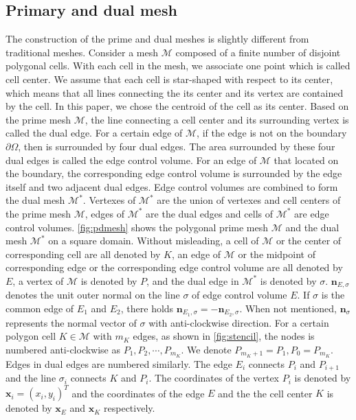 \documentclass[times,review,preprint]{elsarticle}
\newcommand{\bx}{\bm{x}}
\newcommand{\bn}{\bm{n}}
\begin{document}
\subsection{Primary and dual mesh}\label{sec:mesh}

The construction of the prime and dual meshes is slightly different from traditional meshes.
Consider a mesh $\mathcal{M}$ composed of a finite number of disjoint polygonal cells. With each cell in the mesh, we associate one point which is called cell center. We assume that each cell is star-shaped with respect to its center, which means that all lines connecting the its center and its vertex are contained by the cell. In this paper, we chose the centroid of the cell as its center.
Based on the prime mesh $\mathcal{M}$, the line connecting a cell center and its surrounding vertex is called the dual edge. For a certain edge of $\mathcal{M}$, if the edge is not on the boundary $\partial \Omega$, then is surrounded by four dual edges. The area surrounded by these four dual edges is called the edge control volume. For an edge of $\mathcal{M}$ that located on the boundary, the corresponding edge control volume is surrounded by the edge itself and two adjacent dual edges. Edge control volumes are combined to form the dual mesh $\mathcal{M}^*$.
Vertexes of $\mathcal{M}^*$ are the union of vertexes and cell centers of the prime mesh $\mathcal{M}$, edges of $\mathcal{M}^*$ are the dual edges and cells of $\mathcal{M}^*$ are edge control volumes. \cref{fig:pdmesh} shows the polygonal prime mesh $\mathcal{M}$ and the dual mesh $\mathcal{M}^*$ on a square domain.
Without misleading, a cell of $\mathcal{M}$ or the center of corresponding cell are all denoted by $K$, an edge of $\mathcal{M}$ or the midpoint of corresponding edge or the corresponding edge control volume are all denoted by $E$, a vertex of $\mathcal{M}$ is denoted by $P$, and the dual edge in $\mathcal{M}^*$ is denoted by $\sigma$.
$\bn_{E, \sigma}$ denotes the unit outer normal on the line $\sigma$ of edge control volume $E$. If $\sigma$ is the common edge of $E_1$ and $E_2$, there holds $\bn_{E_1, \sigma} = -\bn_{E_2, \sigma}$. When not mentioned, $\bn_{\sigma}$ represents the normal vector of $\sigma$ with anti-clockwise direction.
For a certain polygon cell $K \in \mathcal{M}$ with $m_K$ edges, as shown in \cref{fig:stencil}, the nodes is numbered anti-clockwise as $P_1, P_2, \cdots, P_{m_K}$. We denote $P_{m_K+1} = P_{1}, P_{0} = P_{m_K}$. Edges in dual edges are numbered similarly. The edge $E_i$ connects $P_{i}$ and $P_{i+1}$ and the line $\sigma_i$ connects $K$ and $P_{i}$.
The coordinates of the vertex $P_i$ is denoted by $\bx_i = (x_i, y_i)^T$ and the coordinates of the edge $E$ and the the cell center $K$ is denoted by $\bx_{E}$ and $\bx_K$ respectively.
\end{document}
